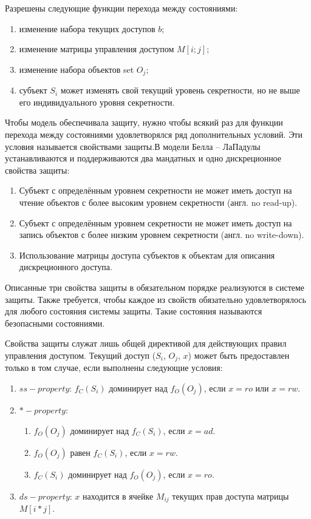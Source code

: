 Разрешены следующие функции перехода между состояниями:

\begin{enumerate}
	\item изменение набора текущих доступов $b$;
	\item изменение матрицы управления доступом $M[i;j]$;
	\item изменение набора объектов set $O_j$;
	\item субъект $S_i$ может изменять свой текущий уровень секретности, но не выше его индивидуального уровня секретности.
\end{enumerate}

Чтобы модель обеспечивала защиту, нужно чтобы всякий раз для функции перехода между состояниями удовлетворялся ряд дополнительных условий. Эти условия называется свойствами защиты.В модели Белла – ЛаПадулы устанавливаются и поддерживаются два мандатных и одно дискреционное свойства защиты\footnotemark:


\begin{enumerate}
    \item Субъект с определённым уровнем секретности не может иметь доступ на чтение объектов с более высоким уровнем секретности (англ. no read-up).
    \item Субъект с определённым уровнем секретности не может иметь доступ на запись объектов с более низким уровнем секретности (англ. no write-down).
    \item Использование матрицы доступа субъектов к объектам для описания дискреционного доступа.
\end{enumerate}

Описанные три свойства защиты в обязательном порядке реализуются в системе защиты. Также требуется, чтобы каждое из свойств обязательно удовлетворялось для любого состояния системы защиты. Такие состояния называются безопасными состояниями.

Свойства защиты служат лишь общей директивой для действующих правил управления доступом. Текущий доступ ($S_i$, $O_j$, $x$) может быть предоставлен только в том случае, если выполнены следующие условия:

\begin{enumerate}
	\item $ss-property$: $f_C(S_i)$ доминирует над $f_O(O_j)$, если $x = ro$ или $x = rw$.
	\item $*-property$:
	\begin{enumerate}
		\item $f_O (O_j)$ доминирует над $f_C(S_i)$, если $x = ad$.
		\item $f_O(O_j)$ равен $f_C(S_i)$, если $x = rw$.
		\item $f_C(S_i)$ доминирует над $f_O(O_j)$, если $x = ro$.
	\end{enumerate}
	\item $ds-property$: $x$ находится в ячейке $M_{ij}$ текущих прав доступа матрицы $M[i*j]$.
\end{enumerate}

